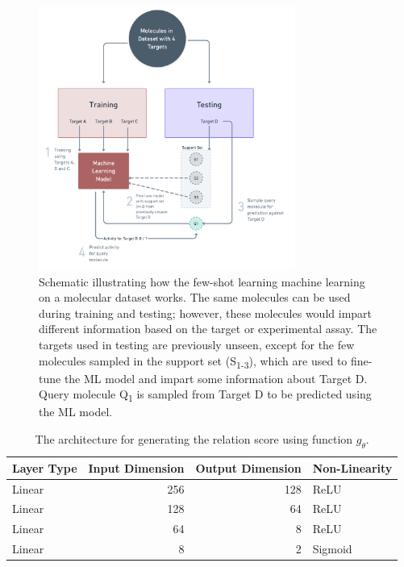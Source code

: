 \documentclass[journal=jcisd8,manuscript=article]{achemso} %
\begin{document}
\begin{figure}[ht!]
    \centering
    \includegraphics[width=0.75\textwidth]{img/Schematic Training.png}
    \caption{Schematic illustrating how the few-shot learning machine learning on a molecular dataset works. The same molecules can be used during training and testing; however, these molecules would impart different information based on the target or experimental assay. The targets used in testing are previously unseen, except for the few molecules sampled in the support set (S\textsubscript{1-3}), which are used to fine-tune the ML model and impart some information about Target D. Query molecule Q\textsubscript{1} is sampled from Target D to be predicted using the ML model.}
    \label{fig:schematic-training}
\end{figure}

\begin{table}[h]
    \centering
    \begin{tabular}{@{}lrrl@{}}
    \hline
    Layer Type & Input Dimension & Output Dimension & Non-Linearity \\
    \hline
    Linear  & 256   & 128   & ReLU \\
    Linear  & 128   & 64    & ReLU \\
    Linear  & 64    & 8     & ReLU \\
    Linear  & 8     & 2     & Sigmoid \\
    \hline
    \end{tabular}
    \caption{The architecture for generating the relation score using function $g_\theta$.}
    \label{table:relation-neural-net}
\end{table}
\end{document}
